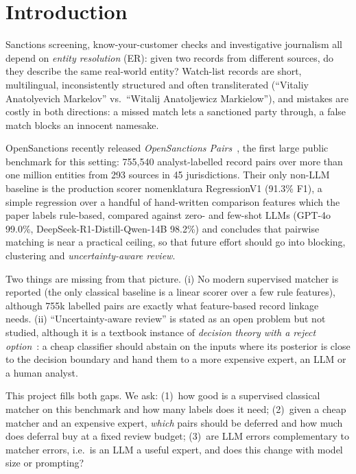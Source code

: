 \documentclass[conference]{IEEEtran}
\begin{document}
\section{Introduction}
Sanctions screening, know-your-customer checks and investigative journalism all depend on \emph{entity resolution} (ER): given two records from different sources, do they describe the same real-world entity? Watch-list records are short, multilingual, inconsistently structured and often transliterated (``Vitaliy Anatolyevich Markelov'' vs.\ ``Witalij Anatoljewicz Markielow''), and mistakes are costly in both directions: a missed match lets a sanctioned party through, a false match blocks an innocent namesake.

OpenSanctions recently released \emph{OpenSanctions Pairs}~\cite{smith2026opensanctions,opensanctions_pairs_docs}, the first large public benchmark for this setting: 755{,}540 analyst-labelled record pairs over more than one million entities from 293 sources in 45 jurisdictions. Their only non-LLM baseline is the production scorer nomenklatura RegressionV1 (91.3\% F1), a simple regression over a handful of hand-written comparison features which the paper labels rule-based, compared against zero- and few-shot LLMs (GPT-4o 99.0\%, DeepSeek-R1-Distill-Qwen-14B 98.2\%) and concludes that pairwise matching is near a practical ceiling, so that future effort should go into blocking, clustering and \emph{uncertainty-aware review}.

Two things are missing from that picture. (i) No modern supervised matcher is reported (the only classical baseline is a linear scorer over a few rule features), although 755k labelled pairs are exactly what feature-based record linkage~\cite{fellegi1969,christen2012} needs. (ii) ``Uncertainty-aware review'' is stated as an open problem but not studied, although it is a textbook instance of \emph{decision theory with a reject option}~\cite{chow1970,bishop2006}: a cheap classifier should abstain on the inputs where its posterior is close to the decision boundary and hand them to a more expensive expert, an LLM or a human analyst.

This project fills both gaps. We ask: (1)~how good is a supervised classical matcher on this benchmark and how many labels does it need; (2)~given a cheap matcher and an expensive expert, \emph{which} pairs should be deferred and how much does deferral buy at a fixed review budget; (3)~are LLM errors complementary to matcher errors, i.e.\ is an LLM a useful expert, and does this change with model size or prompting?
\end{document}
